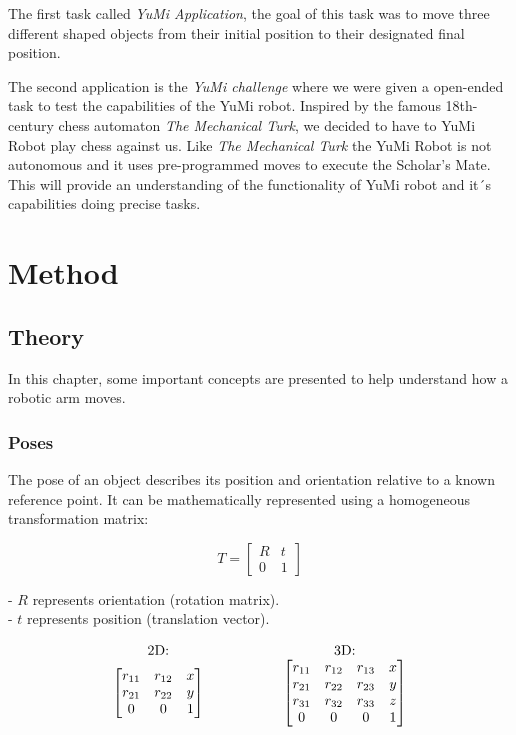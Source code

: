 \documentclass[a4paper,12pt]{article}
\begin{document}
The first task called \textit{YuMi Application}, the goal of this task was to move three different shaped objects from their initial position to their designated final position. 

The second application is the \textit{YuMi challenge} where we were given a open-ended task to test the capabilities of the YuMi robot. Inspired by the famous 18th-century chess automaton \textit{The Mechanical Turk}\cite{mechanicalturk2025}, we decided to have to YuMi Robot play chess against us. Like \textit{The Mechanical Turk} the YuMi Robot is not autonomous and it uses pre-programmed moves to execute the Scholar's Mate. This  will provide an understanding of the functionality of YuMi robot and it´s capabilities doing precise tasks.

\section{Method}
\subsection{Theory}
In this chapter, some important concepts are presented to help understand how a robotic arm moves.

\subsubsection{Poses}
The pose of an object describes its position and orientation relative to a known reference point. It can be mathematically represented using a homogeneous transformation matrix:

\[
T = 
\begin{bmatrix}
R & t \\
0 & 1
\end{bmatrix}
\]

- \( R \) represents orientation (rotation matrix).
\\
- \( t \) represents position (translation vector).

\[
\begin{array}{c@{\hspace{2cm}}c}
\text{2D:} &
\text{3D:} \\
\begin{bmatrix}
r_{11} & r_{12} & x \\
r_{21} & r_{22} & y \\
0 & 0 & 1
\end{bmatrix}
&
\begin{bmatrix}
r_{11} & r_{12} & r_{13} & x \\
r_{21} & r_{22} & r_{23} & y \\
r_{31} & r_{32} & r_{33} & z \\
0 & 0 & 0 & 1
\end{bmatrix}
\end{array}
\]
\end{document}

